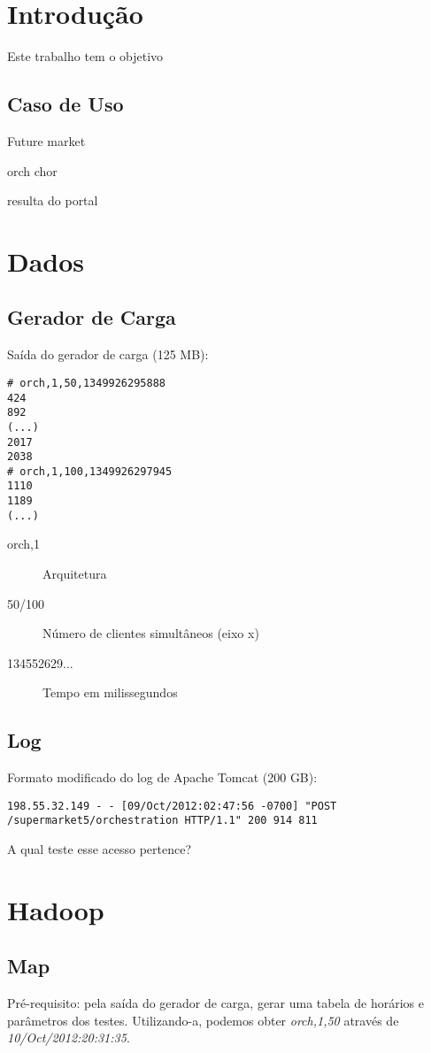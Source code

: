 \documentclass[brazil, a4paper,12pt]{article}
\begin{document}
\section{Introdução}

Este trabalho tem o objetivo

\subsection{Caso de Uso}

Future market

orch
chor

resulta do portal

\section{Dados}

\subsection{Gerador de Carga}
Saída do gerador de carga (125 MB):

\begin{verbatim}
# orch,1,50,1349926295888
424
892
(...)
2017
2038
# orch,1,100,1349926297945
1110
1189
(...)
\end{verbatim}

\begin{description}
  \item[orch,1] Arquitetura
  \item[50/100] Número de clientes simultâneos (eixo x)
  \item[134552629...] Tempo em milissegundos
\end{description}

\subsection{Log}
  Formato modificado do log de Apache Tomcat (200 GB):
\begin{verbatim}
198.55.32.149 - - [09/Oct/2012:02:47:56 -0700] "POST
/supermarket5/orchestration HTTP/1.1" 200 914 811
\end{verbatim}

    A qual teste esse acesso pertence?

    \section{Hadoop}
    \subsection{Map}
    Pré-requisito: pela saída do gerador de carga, gerar uma tabela de horários e   parâmetros dos testes. Utilizando-a, podemos obter \emph{orch,1,50} através de  \emph{10/Oct/2012:20:31:35}.
\end{document}
